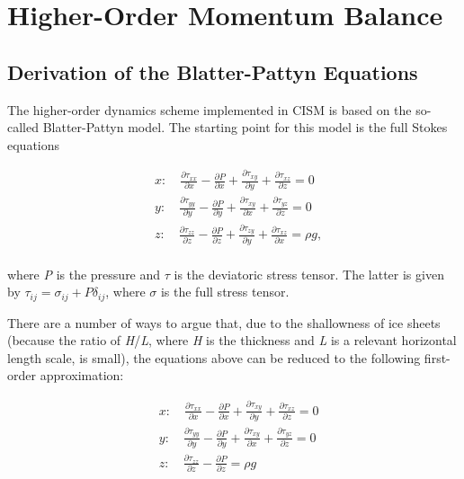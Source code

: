 
\section{Higher-Order Momentum Balance}

\subsection{Derivation of the Blatter-Pattyn Equations}

The higher-order dynamics scheme implemented in CISM is based on the so-called Blatter-Pattyn model. The starting point for this model is the full Stokes equations

\begin{align*}
  & x:\quad \frac{\partial \tau _{xx}}{\partial x}-\frac{\partial P}{\partial x}+\frac{\partial \tau _{xy}}{\partial y}+\frac{\partial \tau _{xz}}{\partial z}=0 \\ 
 & y:\quad \frac{\partial \tau _{yy}}{\partial y}-\frac{\partial P}{\partial y}+\frac{\partial \tau _{xy}}{\partial x}+\frac{\partial \tau _{yz}}{\partial z}=0 \\ 
 & z:\quad \frac{\partial \tau _{zz}}{\partial z}-\frac{\partial P}{\partial z}+\frac{\partial \tau _{zy}}{\partial y}+\frac{\partial \tau _{xz}}{\partial x}=\rho g, \\ 
\end{align*}

where \textit{P} is the pressure and {\large \(\tau{}\)} is the deviatoric stress tensor. The latter is given by $\tau _{ij}=\sigma _{ij}+P\delta _{ij}$, 
where {\large \(\sigma{}\)} is the full stress tensor.

There are a number of ways to argue that, due to the shallowness of ice sheets (because the ratio of \textit{H}/\textit{L}, where \textit{H} is the thickness and \textit{L} is a relevant horizontal length scale, is small), the equations above can be reduced to the following first-order approximation:

\begin{align*}
  & x:\quad \frac{\partial \tau _{xx}}{\partial x}-\frac{\partial P}{\partial x}+\frac{\partial \tau _{xy}}{\partial y}+\frac{\partial \tau _{xz}}{\partial z}=0 \\ 
 & y:\quad \frac{\partial \tau _{yy}}{\partial y}-\frac{\partial P}{\partial y}+\frac{\partial \tau _{xy}}{\partial x}+\frac{\partial \tau _{yz}}{\partial z}=0 \\ 
 & z:\quad \frac{\partial \tau _{zz}}{\partial z}-\frac{\partial P}{\partial z}=\rho g \\ 
\end{align*}


